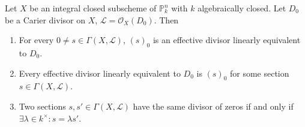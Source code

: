 Let $X$ be an integral closed subscheme of $\mathbb{P}_k^n$ with $k$ algebraically
closed. Let $D_0$ be a Carier divisor on $X$, $\mathcal{L} = \mathcal{O}_X(D_0)$.
Then
\begin{enumerate}
	\item For every $0\neq s \in \Gamma(X, \mathcal{L})$, $(s)_0$ is an effective divisor
		linearly equivalent to $D_0$.
	\item Every effective divisor linearly equivalent to $D_0$ is $(s)_0$ for some
		section $s \in \Gamma(X, \mathcal{L})$.
	\item Two sections $s, s' \in \Gamma(X, \mathcal{L})$ have the same divisor
		of zeros if and only if $\exists \lambda \in k^\times\colon s = \lambda s'$.
\end{enumerate}
